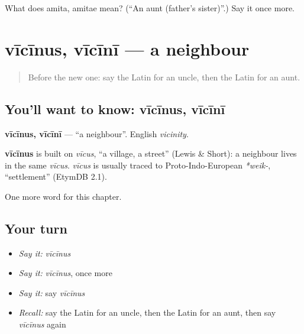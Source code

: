\begin{tcolorbox}[breakable,colback=teal!4,colframe=teal!35!black,title={Before you move on}]
What does amita, amitae mean? (\textquotedblleft{}An aunt (father's sister)\textquotedblright{}.) Say it once more.
\end{tcolorbox}
\section[vīcīnus, vīcīnī]{vīcīnus, vīcīnī — a neighbour}

\label{lesson:LA-C72-vicinus}



\begin{quote}
Before the new one: say the Latin for an uncle, then the Latin for an aunt.
\end{quote}

\subsection*{You'll want to know: vīcīnus, vīcīnī}
\textbf{vīcīnus, vīcīnī} — \textquotedblleft{}a neighbour\textquotedblright{}. English \emph{vicinity}.

\begin{cousinweb}
\textbf{vīcīnus} is built on \emph{vīcus}, \textquotedblleft{}a village, a street\textquotedblright{} (Lewis \& Short): a neighbour lives in the same \emph{vīcus}. \emph{vīcus} is usually traced to Proto-Indo-European \emph{*weik-}, \textquotedblleft{}settlement\textquotedblright{} (EtymDB 2.1).
\end{cousinweb}

\begin{grammarlens}[title={What you've built}]
One more word for this chapter.
\end{grammarlens}

\subsection*{Your turn}
\begin{itemize}
\raggedright
  \item \emph{Say it:} \emph{vīcīnus}
  \item \emph{Say it:} \emph{vīcīnus}, once more
  \item \emph{Say it:} say \emph{vīcīnus}
  \item \emph{Recall:} say the Latin for an uncle, then the Latin for an aunt, then say \emph{vīcīnus} again
\end{itemize}

